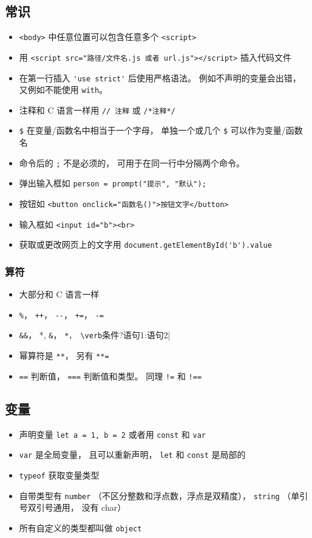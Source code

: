 \subsection{常识}
\begin{itemize}
\item \verb|<body>| 中任意位置可以包含任意多个 \verb|<script>|
\item 用 \verb|<script src="路径/文件名.js 或者 url.js"></script>| 插入代码文件
\item 在第一行插入 \verb|'use strict'| 后使用严格语法。 例如不声明的变量会出错， 又例如不能使用 \verb|with|。
\item 注释和 C 语言一样用 \verb|// 注释| 或 \verb|/*注释*/|
\item \verb|$| 在变量/函数名中相当于一个字母， 单独一个或几个 \verb|$| 可以作为变量/函数名
\item 命令后的 \verb|;| 不是必须的， 可用于在同一行中分隔两个命令。
\item 弹出输入框如 \verb|person = prompt("提示", "默认");|
\item 按钮如 \verb|<button onclick="函数名()">按钮文字</button>|
\item 输入框如 \verb|<input id="b"><br>|
\item 获取或更改网页上的文字用 \verb|document.getElementById('b').value|
\end{itemize}

\subsubsection{算符}
\begin{itemize}
\item 大部分和 C 语言一样
\item \verb|%|， \verb|++|， \verb|--|， \verb|+=|， \verb|-=|
\item \verb|&&|， \verb*||*, \verb|&|， \verb*|*， \verb|条件?语句1:语句2|
\item 幂算符是 \verb|**|， 另有 \verb|**=|
\item \verb|==| 判断值， \verb|===| 判断值和类型。 同理 \verb|!=| 和 \verb|!==|
\end{itemize}

\subsection{变量}
\begin{itemize}
\item 声明变量 \verb|let a = 1, b = 2| 或者用 \verb|const| 和 \verb|var|
\item \verb|var| 是全局变量， 且可以重新声明， \verb|let| 和 \verb|const| 是局部的
\item \verb|typeof| 获取变量类型
\item 自带类型有 \verb|number| （不区分整数和浮点数，浮点是双精度）， \verb|string| （单引号双引号通用， 没有 char）
\item 所有自定义的类型都叫做 \verb|object|
\end{itemize}

